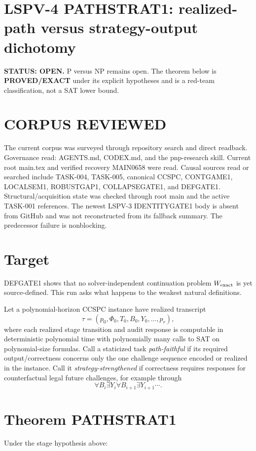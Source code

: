 \documentclass[11pt]{article}
\begin{document}
\section*{LSPV-4 PATHSTRAT1: realized-path versus strategy-output dichotomy}
\textbf{STATUS: OPEN.} P versus NP remains open. The theorem below is \textbf{PROVED/EXACT} under its explicit hypotheses and is a red-team classification, not a SAT lower bound.

\section*{CORPUS REVIEWED}
The current corpus was surveyed through repository search and direct readback. Governance read: AGENTS.md, CODEX.md, and the pnp-research skill. Current root main.tex and verified recovery MAIN0658 were read. Causal sources read or searched include TASK-004, TASK-005, canonical CCSPC, CONTGAME1, LOCALSEM1, ROBUSTGAP1, COLLAPSEGATE1, and DEFGATE1. Structural/acquisition state was checked through root main and the active TASK-001 references. The newest LSPV-3 IDENTITYGATE1 body is absent from GitHub and was not reconstructed from its fallback summary. The predecessor failure is nonblocking.

\section*{Target}
DEFGATE1 shows that no solver-independent continuation problem $W_{\rm exact}$ is yet source-defined. This run asks what happens to the weakest natural definitions.

Let a polynomial-horizon CCSPC instance have realized transcript
\[
\tau=(p_0,\Phi_0,T_0,B_0,Y_0,\ldots,p_r),
\]
where each realized stage transition and audit response is computable in deterministic polynomial time with polynomially many calls to SAT on polynomial-size formulas. Call a staticized task \emph{path-faithful} if its required output/correctness concerns only the one challenge sequence encoded or realized in the instance. Call it \emph{strategy-strengthened} if correctness requires responses for counterfactual legal future challenges, for example through
\[
\forall B_i\exists Y_i\forall B_{i+1}\exists Y_{i+1}\cdots .
\]

\section*{Theorem PATHSTRAT1}
Under the stage hypothesis above:
\end{document}
